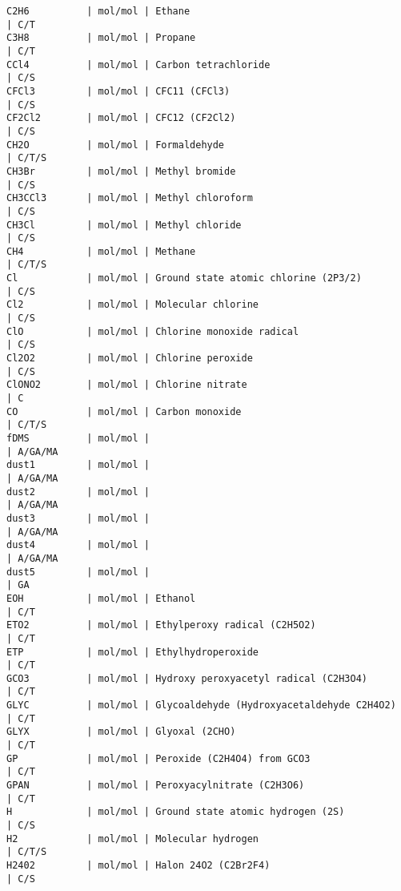 {\begin{verbatim}
C2H6          | mol/mol | Ethane                                          | C/T
C3H8          | mol/mol | Propane                                         | C/T
CCl4          | mol/mol | Carbon tetrachloride                            | C/S
CFCl3         | mol/mol | CFC11 (CFCl3)                                   | C/S
CF2Cl2        | mol/mol | CFC12 (CF2Cl2)                                  | C/S
CH2O          | mol/mol | Formaldehyde                                    | C/T/S
CH3Br         | mol/mol | Methyl bromide                                  | C/S
CH3CCl3       | mol/mol | Methyl chloroform                               | C/S
CH3Cl         | mol/mol | Methyl chloride                                 | C/S
CH4           | mol/mol | Methane                                         | C/T/S
Cl            | mol/mol | Ground state atomic chlorine (2P3/2)            | C/S
Cl2           | mol/mol | Molecular chlorine                              | C/S
ClO           | mol/mol | Chlorine monoxide radical                       | C/S
Cl2O2         | mol/mol | Chlorine peroxide                               | C/S
ClONO2        | mol/mol | Chlorine nitrate                                | C
CO            | mol/mol | Carbon monoxide                                 | C/T/S
fDMS          | mol/mol |                                                 | A/GA/MA
dust1         | mol/mol |                                                 | A/GA/MA
dust2         | mol/mol |                                                 | A/GA/MA
dust3         | mol/mol |                                                 | A/GA/MA
dust4         | mol/mol |                                                 | A/GA/MA
dust5         | mol/mol |                                                 | GA
EOH           | mol/mol | Ethanol                                         | C/T
ETO2          | mol/mol | Ethylperoxy radical (C2H5O2)                    | C/T
ETP           | mol/mol | Ethylhydroperoxide                              | C/T
GCO3          | mol/mol | Hydroxy peroxyacetyl radical (C2H3O4)           | C/T
GLYC          | mol/mol | Glycoaldehyde (Hydroxyacetaldehyde C2H4O2)      | C/T
GLYX          | mol/mol | Glyoxal (2CHO)                                  | C/T
GP            | mol/mol | Peroxide (C2H4O4) from GCO3                     | C/T
GPAN          | mol/mol | Peroxyacylnitrate (C2H3O6)                      | C/T
H             | mol/mol | Ground state atomic hydrogen (2S)               | C/S
H2            | mol/mol | Molecular hydrogen                              | C/T/S
H2402         | mol/mol | Halon 24O2 (C2Br2F4)                            | C/S

\end{verbatim}}
